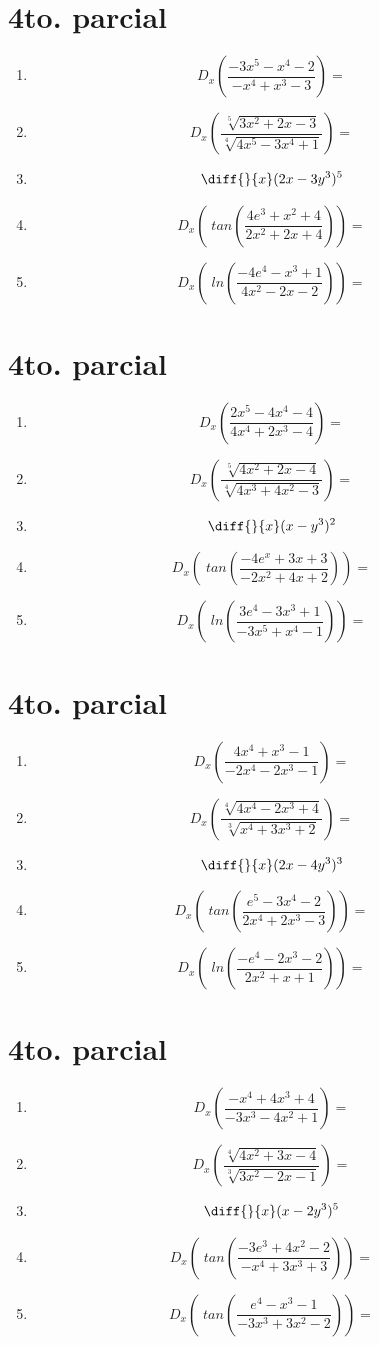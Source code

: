 \documentclass[oneside,spanish,letter]{article}
\begin{document}
\section{4to. parcial}
\begin{enumerate}
 \item $$ D_x \left( \frac{-3x^5-x^4-2}{-x^4+x^3-3}\right)=$$
 \item $$ D_x \left( \frac{\sqrt[5]{3x^2+2x-3}}{\sqrt[4]{4x^5-3x^4+1}}\right)=$$
\item $$\diff{}{x}(2x-3y^3)^5$$
 \item $$ D_x \left(\;tan\left( \frac{4e^3+x^2+4}{2x^2+2x+4}\right)\right)=$$
 \item $$ D_x \left(\;ln\left( \frac{-4e^4-x^3+1}{4x^2-2x-2}\right)\right)=$$
 \end{enumerate}
  \newpage
\section{4to. parcial}
\begin{enumerate}
 \item $$ D_x \left( \frac{2x^5-4x^4-4}{4x^4+2x^3-4}\right)=$$
 \item $$ D_x \left( \frac{\sqrt[5]{4x^2+2x-4}}{\sqrt[4]{4x^3+4x^2-3}}\right)=$$
\item $$\diff{}{x}(x-y^3)^2$$
 \item $$ D_x \left(\;tan\left( \frac{-4e^x+3x+3}{-2x^2+4x+2}\right)\right)=$$
 \item $$ D_x \left(\;ln\left( \frac{3e^4-3x^3+1}{-3x^5+x^4-1}\right)\right)=$$
 \end{enumerate}
  \newpage
\section{4to. parcial}
\begin{enumerate}
 \item $$ D_x \left( \frac{4x^4+x^3-1}{-2x^4-2x^3-1}\right)=$$
 \item $$ D_x \left( \frac{\sqrt[4]{4x^4-2x^3+4}}{\sqrt[3]{x^4+3x^3+2}}\right)=$$
\item $$\diff{}{x}(2x-4y^3)^3$$
 \item $$ D_x \left(\;tan\left( \frac{e^5-3x^4-2}{2x^4+2x^3-3}\right)\right)=$$
 \item $$ D_x \left(\;ln\left( \frac{-e^4-2x^3-2}{2x^2+x+1}\right)\right)=$$
 \end{enumerate}
  \newpage
\section{4to. parcial}
\begin{enumerate}
 \item $$ D_x \left( \frac{-x^4+4x^3+4}{-3x^3-4x^2+1}\right)=$$
 \item $$ D_x \left( \frac{\sqrt[4]{4x^2+3x-4}}{\sqrt[3]{3x^2-2x-1}}\right)=$$
\item $$\diff{}{x}(x-2y^3)^5$$
 \item $$ D_x \left(\;tan\left( \frac{-3e^3+4x^2-2}{-x^4+3x^3+3}\right)\right)=$$
 \item $$ D_x \left(\;tan\left( \frac{e^4-x^3-1}{-3x^3+3x^2-2}\right)\right)=$$
 \end{enumerate}
  \newpage
\end{document}
